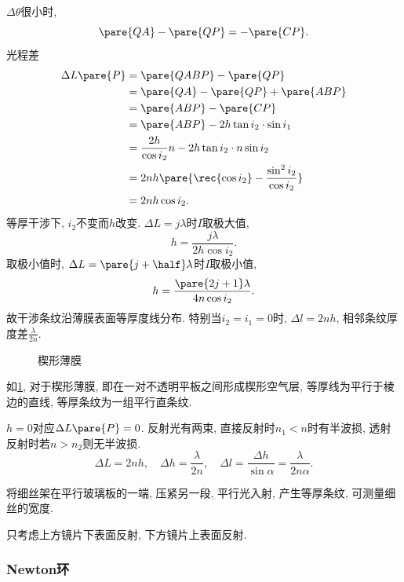 \documentclass{ctexart}
\begin{document}
\begin{figure}[ht]
    \centering
\end{figure}
$\Delta\theta$很小时,
\[ \pare{QA} - \pare{QP} = -\pare{CP}. \]
光程差
\begin{align*}
    \Delta L\pare{P} &= \pare{QABP} - \pare{QP} \\
    &= \pare{QA} - \pare{QP} + \pare{ABP} \\
    &= \pare{ABP} - \pare{CP} \\
    &= \pare{ABP} - 2h\tan i_2 \cdot\sin i_1 \\
    &= \frac{2h}{\cos i_2} n - 2h\tan i_2 \cdot n\sin i_2 \\
    &= 2nh \pare{\rec{\cos i_2} - \frac{\sin^2 i_2}{\cos i_2}} \\
    &= 2nh\cos i_2.
\end{align*}
等厚干涉下, $i_2$不变而$h$改变. $\Delta L = j\lambda$时$I$取极大值,
\[ h = \frac{j\lambda}{2h\cos i_2}. \]
取极小值时, $\Delta L = \pare{\displaystyle j+\half}\lambda$时$I$取极小值,
\[ h = \frac{\pare{2j+1}\lambda}{4n\cos i_2}. \]
故干涉条纹沿薄膜表面等厚度线分布. 特别当$i_2=i_1 = 0$时, $\Delta l = 2nh$, 相邻条纹厚度差$\displaystyle \frac{\lambda}{2n}$.
\begin{figure}[ht]
    \centering
    \caption{楔形薄膜}
    \label{fig:楔形薄膜}
\end{figure}
\par
如\cref{fig:楔形薄膜}, 对于楔形薄膜, 即在一对不透明平板之间形成楔形空气层, 等厚线为平行于棱边的直线, 等厚条纹为一组平行直条纹.
\par
$h=0$对应$\Delta L\pare{P} = 0$. 反射光有两束, 直接反射时$n_1<n$时有半波损, 透射反射时若$n>n_2$则无半波损.
\[ \Delta L = 2nh,\quad \Delta h = \frac{\lambda}{2n},\quad \Delta l = \frac{\Delta h}{\sin \alpha} = \frac{\lambda}{2n\alpha}. \]
\begin{ex}
    将细丝架在平行玻璃板的一端, 压紧另一段, 平行光入射, 产生等厚条纹, 可测量细丝的宽度.
\end{ex}
\begin{pitfall}
    只考虑上方镜片下表面反射, 下方镜片上表面反射.
\end{pitfall}


\subsubsection{Newton环} %
\label{ssub:newton环}
\end{document}

